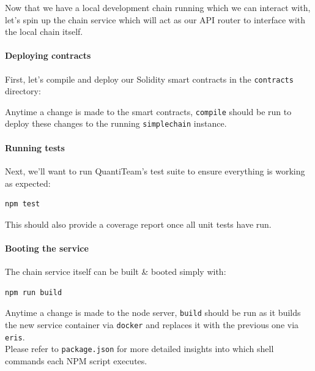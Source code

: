 Now that we have a local development chain running which we can interact
with, let's spin up the chain service which will act as our API router
to interface with the local chain itself.

\paragraph{Deploying contracts}\label{deploying-contracts}

First, let's compile and deploy our Solidity smart contracts in the
\texttt{contracts} directory:

\begin{Shaded}
\begin{Highlighting}[]
 
\end{Highlighting}
\end{Shaded}

Anytime a change is made to the smart contracts, \texttt{compile} should
be run to deploy these changes to the running \texttt{simplechain}
instance.

\paragraph{Running tests}\label{running-tests}

Next, we'll want to run QuantiTeam's test suite to ensure everything is
working as expected:

\begin{verbatim}
npm test
\end{verbatim}

This should also provide a coverage report once all unit tests have run.

\paragraph{Booting the service}\label{booting-the-service}

The chain service itself can be built \& booted simply with:

\begin{verbatim}
npm run build
\end{verbatim}

Anytime a change is made to the node server, \texttt{build} should be
run as it builds the new service container via \texttt{docker} and
replaces it with the previous one via \texttt{eris}.\\
Please refer to \texttt{package.json} for more detailed insights into
which shell commands each NPM script executes.

